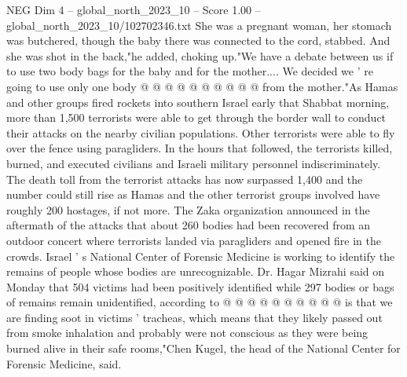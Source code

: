 \begin{textsample}{NEG Dim 4 – global\_north\_2023\_10 – Score 1.00 – global\_north\_2023\_10/102702346.txt}
She was a pregnant woman, her stomach was butchered, though the baby there was connected to the cord, stabbed.
And she was shot in the back,"he added, choking up."We have a debate between us if to use two body bags for the baby and for the mother....
We decided we ' re going to use only one body @ @ @ @ @ @ @ @ @ @ from the mother."As Hamas and other groups fired rockets into southern Israel early that Shabbat morning, more than 1,500 terrorists were able to get through the border wall to conduct their attacks on the nearby civilian populations.
Other terrorists were able to fly over the fence using paragliders.
In the hours that followed, the terrorists killed, burned, and executed civilians and Israeli military personnel indiscriminately.
The death toll from the terrorist attacks has now surpassed 1,400 and the number could still rise as Hamas and the other terrorist groups involved have roughly 200 hostages, if not more.
The Zaka organization announced in the aftermath of the attacks that about 260 bodies had been recovered from an outdoor concert where terrorists landed via paragliders and opened fire in the crowds.
Israel ' s National Center of Forensic Medicine is working to identify the remains of people whose bodies are unrecognizable.
Dr.
Hagar Mizrahi said on Monday that 504 victims had been positively identified while 297 bodies or bags of remains remain unidentified, according to @ @ @ @ @ @ @ @ @ @ is that we are finding soot in victims ' tracheas, which means that they likely passed out from smoke inhalation and probably were not conscious as they were being burned alive in their safe rooms,"Chen Kugel, the head of the National Center for Forensic Medicine, said.

\end{textsample}
